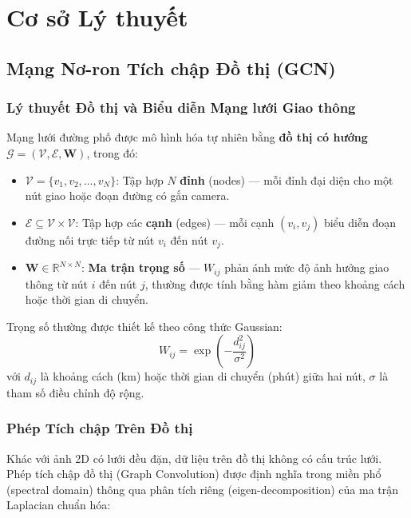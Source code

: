 \chapter{Cơ sở Lý thuyết}

\section{Mạng Nơ-ron Tích chập Đồ thị (GCN)}

\subsection{Lý thuyết Đồ thị và Biểu diễn Mạng lưới Giao thông}

Mạng lưới đường phố được mô hình hóa tự nhiên bằng \textbf{đồ thị có hướng} $\mathcal{G} = (\mathcal{V}, \mathcal{E}, \mathbf{W})$, trong đó:

\begin{itemize}[itemsep=3pt]
  \item $\mathcal{V} = \{v_1, v_2, \ldots, v_N\}$: Tập hợp $N$ \textbf{đỉnh} (nodes) --- mỗi đỉnh đại diện cho một nút giao hoặc đoạn đường có gắn camera.
  \item $\mathcal{E} \subseteq \mathcal{V} \times \mathcal{V}$: Tập hợp các \textbf{cạnh} (edges) --- mỗi cạnh $(v_i, v_j)$ biểu diễn đoạn đường nối trực tiếp từ nút $v_i$ đến nút $v_j$.
  \item $\mathbf{W} \in \mathbb{R}^{N \times N}$: \textbf{Ma trận trọng số} --- $W_{ij}$ phản ánh mức độ ảnh hưởng giao thông từ nút $i$ đến nút $j$, thường được tính bằng hàm giảm theo khoảng cách hoặc thời gian di chuyển.
\end{itemize}

Trọng số thường được thiết kế theo công thức Gaussian:
\begin{equation}
  W_{ij} = \exp\!\left(-\frac{d_{ij}^2}{\sigma^2}\right)
  \label{eq:edge_weight}
\end{equation}
với $d_{ij}$ là khoảng cách (km) hoặc thời gian di chuyển (phút) giữa hai nút, $\sigma$ là tham số điều chỉnh độ rộng.

\subsection{Phép Tích chập Trên Đồ thị}

Khác với ảnh 2D có lưới đều đặn, dữ liệu trên đồ thị không có cấu trúc lưới. Phép tích chập đồ thị (Graph Convolution) được định nghĩa trong miền phổ (spectral domain) thông qua phân tích riêng (eigen-decomposition) của ma trận Laplacian chuẩn hóa:

